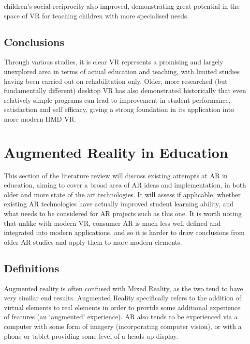\documentclass[11pt]{report}
\begin{document}
children's social reciprocity also improved, demonstrating great potential in the space of VR for teaching children with more specialised needs.
\subsection{Conclusions}
Through various studies, it is clear VR represents a promising and largely unexplored area in terms of actual education and teaching, with limited studies having been carried out on rehabilitation only. Older, more researched (but fundamentally different) desktop VR has also demonstrated historically that even relatively simple programs can lead to improvement in student performance, satisfaction and self efficacy, giving a strong foundation in its application into more modern HMD VR.
\section{Augmented Reality in Education}
This section of the literature review will discuss existing attempts at AR in education, aiming to cover a broad area of AR ideas and implementation, in both older and more state of the art technologies. It will assess if applicable, whether existing AR technologies have actually improved student learning ability, and what needs to be considered for AR projects such as this one. It is worth noting that unlike with modern VR, consumer AR is much less well defined and integrated into modern applications, and so it is harder to draw conclusions from older AR studies and apply them to more modern elements.
\subsection{Definitions}
Augmented reality is often confused with Mixed Reality, as the two tend to have very similar end results. Augmented Reality\cite{Arvanitis2009}\cite{Dunleavy2009} specifically refers to the addition of virtual elements to real elements in order to provide some additional experience of features (an `augmented' experience). AR also tends to be experienced via a computer with some form of imagery (incorporating computer vision), or with a phone or tablet providing some level of a heads up display.
\end{document}
